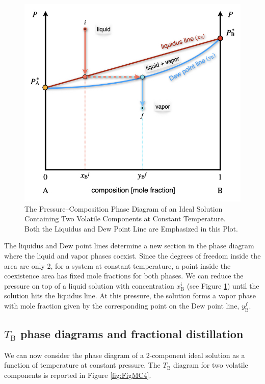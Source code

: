 \documentclass[
  9pt,
]{extbook}
\theoremstyle{definition}
\theoremstyle{definition}
\theoremstyle{definition}
\theoremstyle{definition}
\theoremstyle{remark}
\begin{document}
\begin{figure}

{\centering \includegraphics[width=0.6\linewidth]{./img/OEP_Figures.021} 

}

\caption{The Pressure–Composition Phase Diagram of an Ideal Solution Containing Two Volatile Components at Constant Temperature. Both the Liquidus and Dew Point Line are Emphasized in this Plot.}\label{fig:FigMC3}
\end{figure}

The liquidus and Dew point lines determine a new section in the phase diagram where the liquid and vapor phases coexist. Since the degrees of freedom inside the area are only 2, for a system at constant temperature, a point inside the coexistence area has fixed mole fractions for both phases. We can reduce the pressure on top of a liquid solution with concentration \(x^i_{\text{B}}\) (see Figure \ref{fig:FigMC3}) until the solution hits the liquidus line. At this pressure, the solution forms a vapor phase with mole fraction given by the corresponding point on the Dew point line, \(y^f_{\text{B}}\).

\subsection{\texorpdfstring{\(T_{\text{B}}\) phase diagrams and fractional distillation}{T\_\{\textbackslash text\{B\}\} phase diagrams and fractional distillation}}\label{t_textb-phase-diagrams-and-fractional-distillation}

We can now consider the phase diagram of a 2-component ideal solution as a function of temperature at constant pressure. The \(T_{\text{B}}\) diagram for two volatile components is reported in Figure \ref{fig:FigMC4}.
\end{document}
